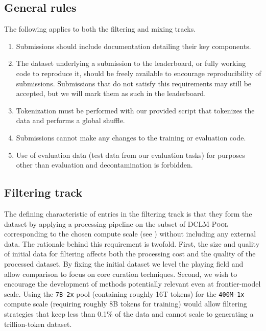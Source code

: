\documentclass{article}
\newcommand{\rawpool}{\textsc{DCLM-Pool}\xspace}
\newcommand{\xstrack}{\texttt{400M-1x}\xspace}
\newcommand{\xltrack}{\texttt{7B-2x}\xspace}
\begin{document}
\subsection{General rules}
The following applies to both the filtering and mixing tracks.
\begin{enumerate}
    \item Submissions should include documentation detailing their key components.

    \item The dataset underlying a submission to the leaderboard, or fully working code to reproduce it, should be freely available to encourage reproducibility of submissions.
    Submissions that do not satisfy this requirements may still be accepted, but we will mark them as such in the leaderboard.

    \item Tokenization must be performed with our provided script that tokenizes the data and performs a global shuffle.

    \item Submissions cannot make any changes to the training or evaluation code.

    \item Use of evaluation data (test data from our evaluation tasks) for purposes other than evaluation and decontamination is forbidden.
\end{enumerate}

\subsection{Filtering track}

The defining characteristic of entries in the filtering track is that they form the dataset by applying a processing pipeline on the subset of \rawpool corresponding to the chosen compute scale (see ) without including any external data. The rationale behind this requirement is twofold. First, the size and quality of initial data for filtering affects both the processing cost and the quality of the processed dataset. By fixing the initial dataset we level the playing field and allow comparison to focus on core curation techniques.
Second, we wish to encourage the development of methods potentially relevant even at frontier-model scale. Using the \xltrack pool (containing roughly 16T tokens) for the \xstrack compute scale (requiring roughly 8B tokens for training) would allow filtering strategies that keep less than 0.1\% of the data and cannot scale to generating a trillion-token dataset.
\end{document}
